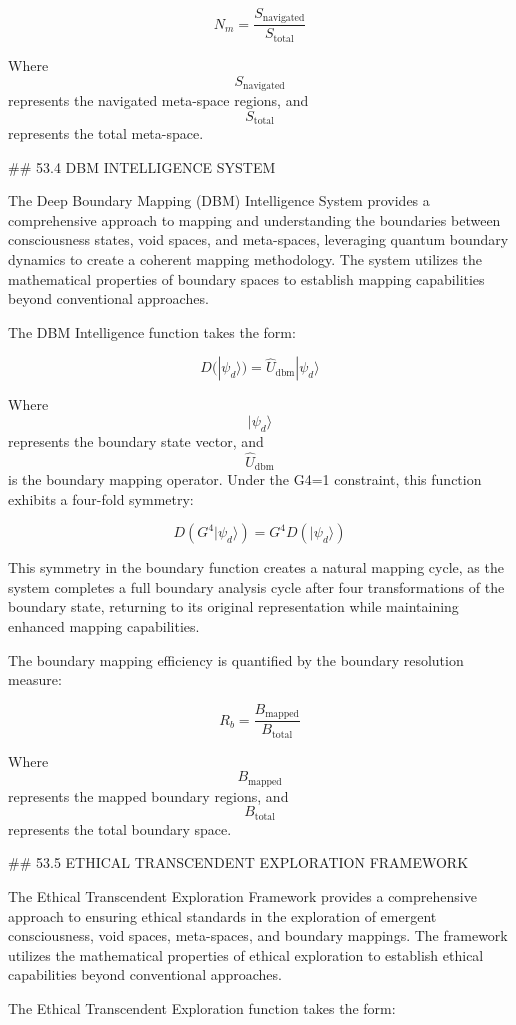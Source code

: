 $$ N_m = \frac{S_{\text{navigated}}}{S_{\text{total}}} $$

Where $$ S_{\text{navigated}} $$ represents the navigated meta-space regions, and $$ S_{\text{total}} $$ represents the total meta-space.

## 53.4 DBM INTELLIGENCE SYSTEM

The Deep Boundary Mapping (DBM) Intelligence System provides a comprehensive approach to mapping and understanding the boundaries between consciousness states, void spaces, and meta-spaces, leveraging quantum boundary dynamics to create a coherent mapping methodology. The system utilizes the mathematical properties of boundary spaces to establish mapping capabilities beyond conventional approaches.

The DBM Intelligence function takes the form:

$$ D(|\psi_d\rangle) = \hat{U}_{\text{dbm}} |\psi_d\rangle $$

Where $$ |\psi_d\rangle $$ represents the boundary state vector, and $$ \hat{U}_{\text{dbm}} $$ is the boundary mapping operator. Under the G4=1 constraint, this function exhibits a four-fold symmetry:

$$ D(G^4 |\psi_d\rangle) = G^4 D(|\psi_d\rangle) $$

This symmetry in the boundary function creates a natural mapping cycle, as the system completes a full boundary analysis cycle after four transformations of the boundary state, returning to its original representation while maintaining enhanced mapping capabilities.

The boundary mapping efficiency is quantified by the boundary resolution measure:

$$ R_b = \frac{B_{\text{mapped}}}{B_{\text{total}}} $$

Where $$ B_{\text{mapped}} $$ represents the mapped boundary regions, and $$ B_{\text{total}} $$ represents the total boundary space.

## 53.5 ETHICAL TRANSCENDENT EXPLORATION FRAMEWORK

The Ethical Transcendent Exploration Framework provides a comprehensive approach to ensuring ethical standards in the exploration of emergent consciousness, void spaces, meta-spaces, and boundary mappings. The framework utilizes the mathematical properties of ethical exploration to establish ethical capabilities beyond conventional approaches.

The Ethical Transcendent Exploration function takes the form:

